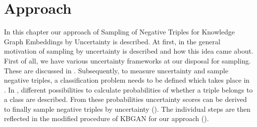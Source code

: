 \chapter{Approach}
\label{ch:approach}

In this chapter our approach of Sampling of Negative Triples for Knowledge Graph Embeddings by Uncertainty is described.
At first, in  the general motivation of sampling by uncertainty is described and how this idea came about.
First of all, we have various uncertainty frameworks at our disposal for sampling.
These are discussed in .
Subsequently, to measure uncertainty and sample negative triples, a classification problem needs to be defined which takes place in .
In , different possibilities to calculate probabilities of whether a triple belongs to a class are described.
From these probabilities uncertainty scores can be derived to finally sample negative triples by uncertainty ().
The individual steps are then reflected in the modified procedure of \textsc{KBGAN} for our approach ().













%